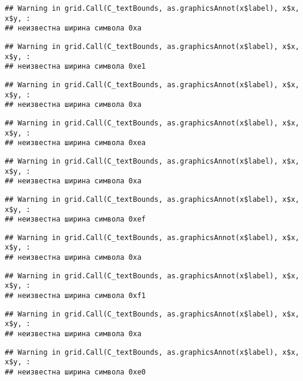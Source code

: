 \documentclass[
]{article}
\begin{document}
\begin{verbatim}
## Warning in grid.Call(C_textBounds, as.graphicsAnnot(x$label), x$x, x$y, :
## неизвестна ширина символа 0xa
\end{verbatim}

\begin{verbatim}
## Warning in grid.Call(C_textBounds, as.graphicsAnnot(x$label), x$x, x$y, :
## неизвестна ширина символа 0xe1
\end{verbatim}

\begin{verbatim}
## Warning in grid.Call(C_textBounds, as.graphicsAnnot(x$label), x$x, x$y, :
## неизвестна ширина символа 0xa
\end{verbatim}

\begin{verbatim}
## Warning in grid.Call(C_textBounds, as.graphicsAnnot(x$label), x$x, x$y, :
## неизвестна ширина символа 0xea
\end{verbatim}

\begin{verbatim}
## Warning in grid.Call(C_textBounds, as.graphicsAnnot(x$label), x$x, x$y, :
## неизвестна ширина символа 0xa
\end{verbatim}

\begin{verbatim}
## Warning in grid.Call(C_textBounds, as.graphicsAnnot(x$label), x$x, x$y, :
## неизвестна ширина символа 0xef
\end{verbatim}

\begin{verbatim}
## Warning in grid.Call(C_textBounds, as.graphicsAnnot(x$label), x$x, x$y, :
## неизвестна ширина символа 0xa
\end{verbatim}

\begin{verbatim}
## Warning in grid.Call(C_textBounds, as.graphicsAnnot(x$label), x$x, x$y, :
## неизвестна ширина символа 0xf1
\end{verbatim}

\begin{verbatim}
## Warning in grid.Call(C_textBounds, as.graphicsAnnot(x$label), x$x, x$y, :
## неизвестна ширина символа 0xa
\end{verbatim}

\begin{verbatim}
## Warning in grid.Call(C_textBounds, as.graphicsAnnot(x$label), x$x, x$y, :
## неизвестна ширина символа 0xe0
\end{verbatim}
\end{document}
